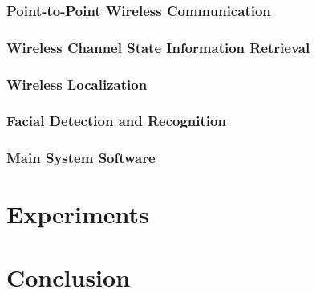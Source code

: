 \documentclass[12pt]{report}
\begin{document}
\subsection{Point-to-Point Wireless Communication}


\subsection{Wireless Channel State Information Retrieval}


\subsection{Wireless Localization}


\subsection{Facial Detection and Recognition}


\subsection{Main System Software}



\chapter{Experiments}

\chapter{Conclusion}

%
%

%

\end{document}
